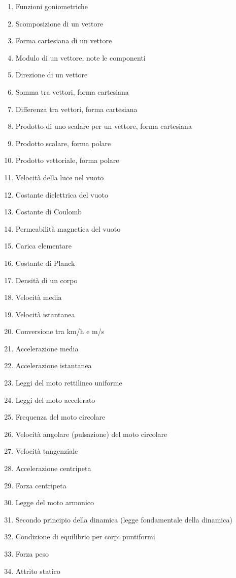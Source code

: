 \documentclass[a4paper,11pt,italian]{article}
\begin{document}
\begin{enumerate}
\item Funzioni goniometriche
\item Scomposizione di un vettore
\item Forma cartesiana di un vettore
\item Modulo di un vettore, note le componenti
\item Direzione di un vettore 
\item Somma tra vettori, forma cartesiana
\item Differenza tra vettori, forma cartesiana
\item Prodotto di uno scalare per un vettore, forma cartesiana
\item Prodotto scalare, forma polare
\item Prodotto vettoriale, forma polare
\item Velocità della luce nel vuoto
\item Costante dielettrica del vuoto
\item Costante di Coulomb
\item Permeabilità magnetica del vuoto
\item Carica elementare
\item Costante di Planck
\item Densità di un corpo
\item Velocità media
\item Velocità istantanea
\item Conversione tra km/h e m/s
\item Accelerazione media
\item Accelerazione istantanea
\item Leggi del moto rettilineo uniforme
\item Leggi del moto accelerato
\item Frequenza del moto circolare
\item Velocità angolare (pulsazione) del moto circolare
\item Velocità tangenziale
\item Accelerazione centripeta
\item Forza centripeta
\item Legge del moto armonico 
\item Secondo principio della dinamica (legge fondamentale della dinamica)
\item Condizione di equilibrio per corpi puntiformi
\item Forza peso
\item Attrito statico

\end{enumerate}
\end{document}
